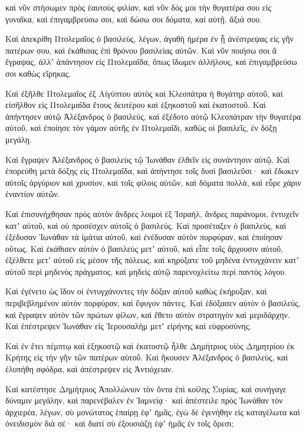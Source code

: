 {καὶ νῦν στήσωμεν πρὸς ἑαυτοὺς φιλίαν, καὶ νῦν δός μοι τὴν θυγατέρα σου εἰς γυναῖκα, καὶ ἐπιγαμβρεύσω σοι, καὶ δώσω σοι δόματα, καὶ αὐτῇ. ἄξιά σου.
\par }{\PP {}Καὶ ἀπεκρίθη Πτολεμαῖος ὁ βασιλεὺς, λέγων, ἀγαθὴ ἡμέρα ἐν ᾗ ἀνέστρεψας εἰς γῆν πατέρων σου, καὶ ἐκάθισας ἐπὶ θρόνου βασιλείας αὐτῶν.
Καὶ νῦν ποιήσω σοι ἃ ἔγραψας, ἀλλʼ ἀπάντησον εἰς Πτολεμαΐδα, ὅπως ἴδωμεν ἀλλήλους, καὶ ἐπιγαμβρεύσω σοι καθὼς εἴρηκας.
\par }{\PP {}Καὶ ἐξῆλθε Πτολεμαῖος ἐξ Αἰγύπτου αὐτὸς καὶ Κλεοπάτρα ἡ θυγάτηρ αὐτοῦ, καὶ εἰσῆλθον εἰς Πτολεμαΐδα ἔτους δευτέρου καὶ ἑξηκοστοῦ καὶ ἑκατοστοῦ.
Καὶ ἀπήντησεν αὐτῷ Ἀλέξανδρος ὁ βασιλεὺς, καὶ ἐξέδοτο αὐτῷ Κλεοπάτραν τὴν θυγατέρα αὐτοῦ, καὶ ἐποίησε τὸν γάμον αὐτῆς ἐν Πτολεμαΐδι, καθὼς οἱ βασιλεῖς, ἐν δόξῃ μεγάλῃ.
\par }{\PP {}Καὶ ἔγραψεν Ἀλέξανδρος ὁ βασιλεὺς τῷ Ἰωνάθαν ἐλθεῖν εἰς συνάντησιν αὐτῷ.
Καὶ ἐπορεύθη μετὰ δόξης εἰς Πτολεμαΐδα, καὶ ἀπήντησε τοῖς δυσὶ βασιλεῦσι· καὶ ἔδωκεν αὐτοῖς ἀργύριον καὶ χρυσίον, καὶ τοῖς φίλοις αὐτῶν, καὶ δόματα πολλὰ, καὶ εὗρε χάριν ἐναντίον αὐτῶν.
\par }{\PP {}Καὶ ἐπισυνήχθησαν πρὸς αὐτὸν ἄνδρες λοιμοὶ ἐξ Ἰσραὴλ, ἄνδρες παράνομοι, ἐντυχεῖν κατʼ αὐτοῦ, καὶ οὐ προσέσχεν αὐτοῖς ὁ βασιλεύς.
Καὶ προσέταξεν ὁ βασιλεὺς, καὶ ἐξέδυσαν Ἰωνάθαν τὰ ἱμάτια αὐτοῦ, καὶ ἐνέδυσαν αὐτὸν πορφύραν, καὶ ἐποίησαν οὕτως.
Καὶ ἐκάθισεν αὐτὸν ὁ βασιλεὺς μετʼ αὐτοῦ, καὶ εἶπε τοῖς ἄρχουσιν αὐτοῦ, ἐξέλθετε μετʼ αὐτοῦ εἰς μέσον τῆς πόλεως, καὶ κηρύξατε τοῦ μηδένα ἐντυγχάνειν κατʼ αὐτοῦ περὶ μηδενὸς πράγματος, καὶ μηδεὶς αὐτῷ παρενοχλείτω περὶ παντὸς λόγου.
\par }{\PP {}Καὶ ἐγένετο ὡς ἴδον οἱ ἐντυγχάνοντες τὴν δόξαν αὐτοῦ καθὼς ἐκήρυξαν, καὶ περιβεβλημένον αὐτὸν πορφύραν, καὶ ἔφυγον πάντες.
Καὶ ἐδόξασεν αὐτὸν ὁ βασιλεύς, καὶ ἔγραψεν αὐτὸν τῶν πρώτων φίλων, καὶ ἔθετο αὐτὸν στρατηγὸν καὶ μεριδάρχην.
Καὶ ἐπέστρεψεν Ἰωνάθαν εἰς Ἱερουσαλὴμ μετʼ εἰρήνης καὶ εὐφροσύνης.
\par }{\PP {}Καί ἐν ἔτει πέμπτῳ καὶ ἑξηκοστῷ καὶ ἑκατοστῷ ἦλθε Δημήτριος υἱὸς Δημητρίου ἐκ Κρήτης εἰς τὴν γῆν τῶν πατέρων αὐτοῦ.
Καὶ ἤκουσεν Ἀλέξανδρος ὁ βασιλεὺς, καὶ ἐλυπήθη σφόδρα, καὶ ἀπέστρεψεν εἰς Ἀντιόχειαν.
\par }{\PP {}Καὶ κατέστησε Δημήτριος Ἀπολλώνιον τὸν ὄντα ἐπὶ κοίλης Συρίας, καὶ συνήγαγε δύναμιν μεγάλην, καὶ παρενέβαλεν ἐν Ἰαμνείᾳ·
καὶ ἀπέστειλε πρὸς Ἰωνάθαν τὸν ἀρχιερέα, λέγων, σὺ μονώτατος ἐπαίρῃ ἐφʼ ἡμᾶς, ἐγὼ δὲ ἐγενήθην εἰς καταγέλωτα καὶ ὀνειδισμὸν διὰ σέ· καὶ διατί σὺ ἐξουσιάζῃ ἐφʼ ἡμᾶς ἐν τοῖς ὄρεσι;
}
